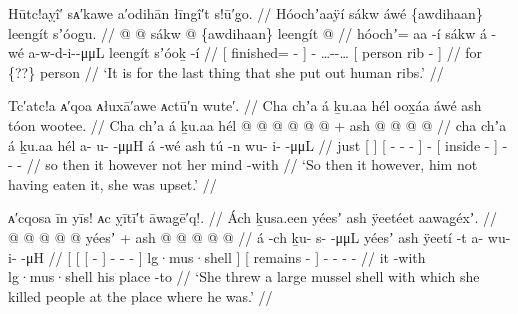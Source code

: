 \ex\label{ex:91-264-last-put-out-human-ribs}%
%
\begingl
	\glpreamble	Hūtc!aỵî′ sᴀ′kawe a′odihān łīngî′t s!ū′g̣o. //
	\glpreamble	Hóochʼaaÿí sákw áwé \{awdihaan\} leengít sʼóog̱u. //
	\gla	{}  @ {} @ {} sákw {}  @ {}
		\{awdihaan\}
		{} leengít  @ {} {} //
	\glb	{} hóochʼ= aa -í sákw {} á -wé
		a-w-d-i--μμL
		{} leengít sʼóoḵ -í {} //
	\glc	{}[ finished=  -  {}]  -
		…--…
		{}[ person rib - {}] //
	\gld	{}  {} {} for {}  {}
		\{??\}
		{} person  {} {} //
	\glft	‘It is for the last thing that she put out human ribs.’
		//
\endgl
\xe

\ex\label{ex:91-265-not-having-eaten-upset}%
%
\begingl
	\glpreamble	Tc′atc!a ᴀ′qoa ᴀłuxā′awe ᴀctū′n wute′. //
	\glpreamble	Cha chʼa á ḵu.aa hél oox̱áa áwé ash tóon wootee. //
	\gla	Cha chʼa {} á {} ḵu.aa
		{} hél  @ {} @ {} @ {} @ {} @ {} {}  @ {} +
		{} ash  @ {} {}
		 @ {} @ {} @ {} //
	\glb	cha chʼa {} á {} ḵu.aa
		{} hél a- u- {}  -μμH {} {} á -wé
		{} ash tú -n {}
		wu- i-  -μμL //
	\glc	{} just {}[  {}] 
		{}[  - - \·
			 - \· {}]  -
		{}[  inside - {}]
		- -  - //
	\gld	so then {} it {} however
		{} not  {} {} {} {} {} {}  {}
		{} her mind -with {}
		 {} {} {} //
	\glft	‘So then it however, him not having eaten it, she was upset.’
		//
\endgl
\xe


\ex\label{ex:91-266-threw-shell-at-him}%
%
\begingl
	\glpreamble	ᴀ′cqosa īn yīs! ᴀc ỵītī′t āwag̣ē′q!. //
	\glpreamble	Ách ḵusa.een yéesʼ ash ÿeetéet aawag̱éxʼ. //
	\gla	{} {} {}  @ {} {}  @ {} @ {} @ {} @ {} {} yéesʼ {} +
		{} ash  @ {} {}
		 @ {} @ {} @ {} @ {} //
	\glb	{} {} {} á -ch {} ḵu- s-  -μμL {} {} yéesʼ {}
		{} ash ÿeetí -t {}
		a- wu- i-  -μH //
	\glc	{}[ {}[ {}[  - {}]
			- -  - \· {}]
			lg·mus·shell {}]
		{}[  remains - {}]
		- - -  - //
	\gld	{} {} {} it -with {}
			 {} {} {} {} {}
			lg·mus·shell {}
		{} his place -to {}
		 {} {} {} {} //
	\glft	‘She threw a large mussel shell with which she killed people at the place where he was.’
		//
\endgl
\xe

